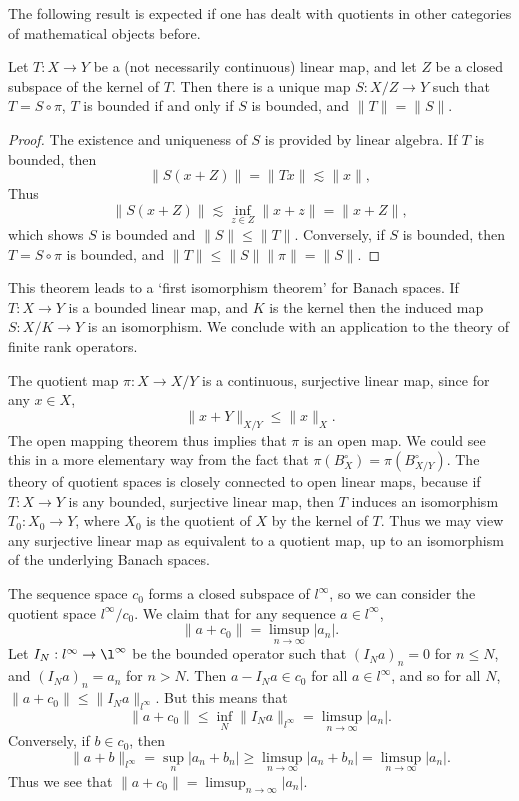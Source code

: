 The following result is expected if one has dealt with quotients in other categories of mathematical objects before.

\begin{theorem}
    Let $T: X \to Y$ be a (not necessarily continuous) linear map, and let $Z$ be a closed subspace of the kernel of $T$. Then there is a unique map $S: X/Z \to Y$ such that $T = S \circ \pi$, $T$ is bounded if and only if $S$ is bounded, and $\| T \| = \| S \|$.
\end{theorem}
\begin{proof}
    The existence and uniqueness of $S$ is provided by linear algebra. If $T$ is bounded, then
    \[ \| S(x + Z) \| = \| Tx \| \lesssim \| x \|, \]
    Thus
    \[ \| S(x + Z) \| \lesssim \inf_{z \in Z} \| x + z \| = \| x + Z \|, \]
    which shows $S$ is bounded and $\| S \| \leq \| T \|$. Conversely, if $S$ is bounded, then $T = S \circ \pi$ is bounded, and $\| T \| \leq \| S \| \| \pi \| = \| S \|$.
\end{proof}

This theorem leads to a `first isomorphism theorem' for Banach spaces. If $T: X \to Y$ is a bounded linear map, and $K$ is the kernel then the induced map $S: X/K \to Y$ is an isomorphism. We conclude with an application to the theory of finite rank operators.

The quotient map $\pi: X \to X/Y$ is a continuous, surjective linear map, since for any $x \in X$,
%
\[ \| x + Y \|_{X/Y} \leq \| x \|_X. \]
%
The open mapping theorem thus implies that $\pi$ is an open map. We could see this in a more elementary way from the fact that $\pi(B_X^\circ) = \pi(B_{X/Y}^\circ)$. The theory of quotient spaces is closely connected to open linear maps, because if $T: X \to Y$ is any bounded, surjective linear map, then $T$ induces an isomorphism $T_0: X_0 \to Y$, where $X_0$ is the quotient of $X$ by the kernel of $T$. Thus we may view any surjective linear map as equivalent to a quotient map, up to an isomorphism of the underlying Banach spaces.

\begin{example}
    The sequence space $c_0$ forms a closed subspace of $l^\infty$, so we can consider the quotient space $l^\infty / c_0$. We claim that for any sequence $a \in l^\infty$,
    \[ \| a + c_0 \| = \limsup_{n \to \infty} |a_n|. \]
    Let $I_N: l^\infty \to \l^\infty$ be the bounded operator such that $(I_N a)_n = 0$ for $n \leq N$, and $(I_N a)_n = a_n$ for $n > N$. Then $a - I_N a \in c_0$ for all $a \in l^\infty$, and so for all $N$, $\| a + c_0 \| \leq \| I_N a \|_{l^\infty}$. But this means that
    \[ \| a + c_0 \| \leq \inf_N \| I_N a \|_{l^\infty} = \limsup_{n \to \infty} |a_n|. \]
    Conversely, if $b \in c_0$, then
    \[ \| a + b \|_{l^\infty} = \sup_n |a_n + b_n| \geq \limsup_{n \to \infty} |a_n + b_n| = \limsup_{n \to \infty} |a_n|. \]
    Thus we see that $\| a + c_0 \| = \limsup_{n \to \infty} |a_n|$.
\end{example}

